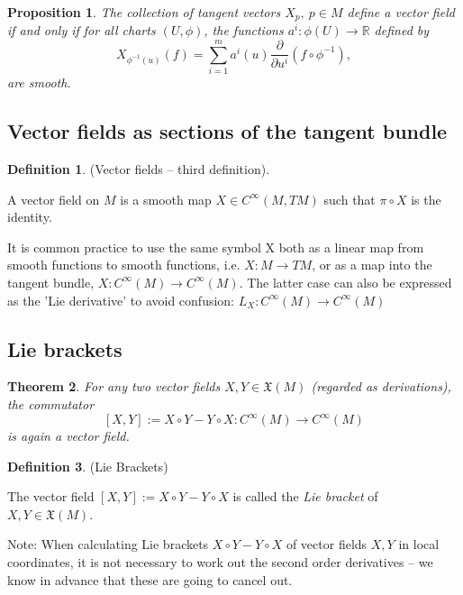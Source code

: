\documentclass{article}
\newtheorem{theorem}{Theorem}[section]
\newtheorem{proposition}{Proposition}[theorem]
\theoremstyle{definition}
\newtheorem{defn}[theorem]{Definition}
\newenvironment{definition}
  {\vspace{8pt}\begin{mdframed}[backgroundcolor=blueish]\begin{defn}}
  {\end{defn}\end{mdframed}\vspace{4pt}}
\begin{document}
\begin{proposition}

The collection of tangent vectors $X_p,\  p \in M$ define a vector field if and only if for all charts $(U,\phi)$, the functions $a^i : \phi(U) \rightarrow \mathbb R$ defined by 
\[
    X_{\phi^{-1}(u)} (f) = \sum_{i=1}^m a^i (u) \frac{\partial}{\partial u^i} (f \circ \phi^{-1}),
\]
are smooth.

\end{proposition}

\subsection{Vector fields as sections of the tangent bundle}


\begin{definition} (Vector fields – third definition).

A vector field on $M$ is a smooth map $X \in C^\infty(M,TM)$ such that $\pi \circ X$ is the identity.

\end{definition}

It is common practice to use the same symbol X both as a linear map from smooth functions to smooth functions, i.e. $X : M \rightarrow TM$, or as a map into the tangent bundle, $X : C^\infty(M) \rightarrow C^\infty(M)$. The latter case can also be expressed as the 'Lie derivative' to avoid confusion: $L_X : C^\infty(M) \rightarrow C^\infty(M)$

\subsection{Lie brackets}
\begin{theorem}

For any two vector fields $X,Y \in \mathfrak X(M)$ (regarded as derivations), the commutator 
\[
    [X,Y] := X \circ Y - Y \circ X : C^\infty (M) \rightarrow C^\infty (M)
\]
is again a vector field.

\end{theorem}

\begin{definition} (Lie Brackets)

The vector field $[X,Y] := X \circ Y - Y \circ X$ is called the \textit{Lie bracket} of $X,Y \in \mathfrak X(M)$.

\end{definition}

Note: When calculating Lie brackets $X \circ Y - Y \circ X$ of vector fields $X,Y$ in local coordinates, it is not necessary to work out the second order derivatives – we know in advance that these are going to cancel out.
\end{document}
